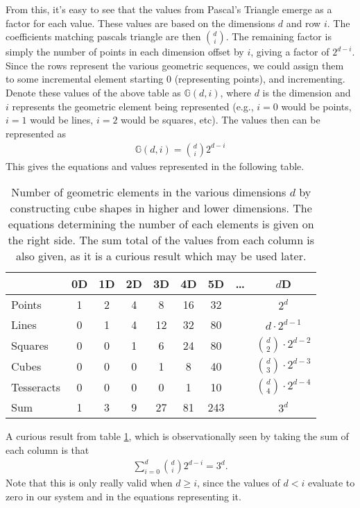 From this, it's easy to see that the values from Pascal's Triangle emerge as a factor for each value. These values are based on the dimensions $d$ and row $i$. The coefficients matching pascals triangle are then $\binom{d}{i}$. The remaining factor is simply the number of points in each dimension offset by $i$, giving a factor of $2^{d-i}$. Since the rows represent the various geometric sequences, we could assign them to some incremental element starting 0 (representing points), and incrementing. Denote these values of the above table as $\mathbb{G}(d,i)$, where $d$ is the dimension and $i$ represents the geometric element being represented (e.g., $i=0$ would be points, $i=1$ would be lines, $i=2$ would be squares, etc). The values then can be represented as
\begin{align}
	\mathbb{G}(d, i) = \binom{d}{i} 2^{d-i}
\end{align}
This gives the equations and values represented in the following table.
\begin{table}[htbp]
	\centering
	\begin{tabular}{lcccccccc}
		\toprule
		& 0D & 1D & 2D & 3D & 4D & 5D &\dots& \(d\)D \\
		\midrule
		Points     & 1  & 2  & 4  & 8  & 16 & 32 && \(2^d\) \\
		Lines      & 0  & 1  & 4  & 12 & 32 & 80 && \(d \cdot 2^{d-1}\) \\
		Squares    & 0  & 0  & 1  & 6  & 24 & 80 && \(\binom{d}{2} \cdot 2^{d-2}\) \\
		Cubes      & 0  & 0  & 0  & 1  & 8  & 40 && \(\binom{d}{3} \cdot 2^{d-3}\) \\
		Tesseracts & 0  & 0  & 0  & 0  & 1  & 10 && \(\binom{d}{4} \cdot 2^{d-4}\) \\
		\bottomrule
		Sum        & 1  & 3  & 9  & 27  & 81 & 243 && \(3^d\) \\
	\end{tabular}
	\caption{Number of geometric elements in the various dimensions $d$ by constructing cube shapes in higher and lower dimensions. The equations determining the number of each elements is given on the right side. The sum total of the values from each column is also given, as it is a curious result which may be used later.}
	\label{tab:hypercube_elements}
\end{table}

A curious result from table \ref{tab:hypercube_elements}, which is observationally seen by taking the sum of each column is that
\begin{align}
\sum_{i=0}^{d}\binom{d}{i}2^{d-i} = 3^d.
\end{align}
Note that this is only really valid when $d\geq i$, since the values of $d<i$ evaluate to zero in our system and in the equations representing it.















